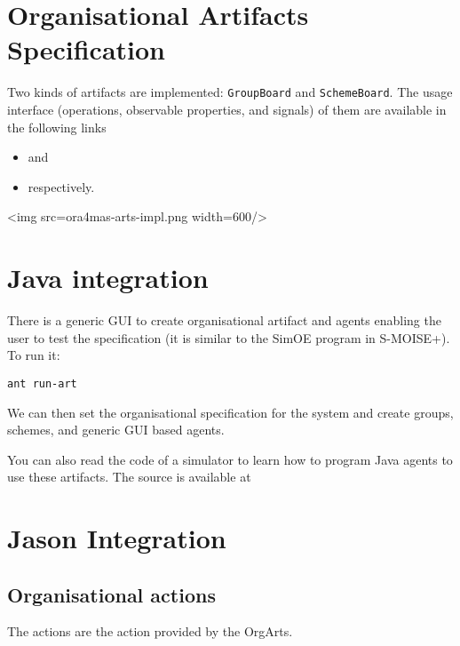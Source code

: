 \documentclass{article}
\newcommand{\code}[1]{\texttt{#1}}
\begin{document}
\section*{Organisational Artifacts Specification}

Two kinds of artifacts are implemented: \code{GroupBoard} and
\code{SchemeBoard}. The usage interface (operations, observable
properties, and signals) of them are available in the following links
\begin{itemize}
\item {} and
\item {} respectively.
\end{itemize}

\begin{rawhtml}
    <img src=ora4mas-arts-impl.png width=600/>
\end{rawhtml}

\section*{Java integration}

There is a generic GUI to create organisational artifact and agents
enabling the user to test the specification (it is similar to the
SimOE program in S-MOISE+). To run it:
\begin{verbatim}
ant run-art
\end{verbatim}

We can then set the organisational specification for the system and
create groups, schemes, and generic GUI based agents.

You can also read the code of a simulator to learn how to program Java
agents to use these artifacts. The source is available at

\section*{Jason Integration}

\subsection*{Organisational actions}

The actions are the action provided by the OrgArts.
\end{document}
